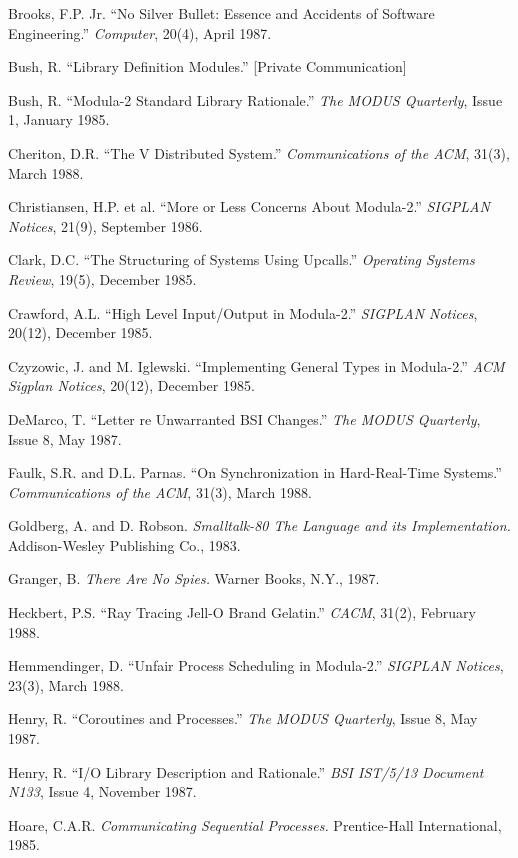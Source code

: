 Brooks, F.P. Jr. ``No Silver Bullet: Essence and Accidents of Software 
Engineering.'' {\em Computer}, 20(4), April 1987.
\smallskip

Bush, R. ``Library Definition Modules.'' [Private Communication]
\smallskip

Bush, R. ``Modula-2 Standard Library Rationale.'' {\em The MODUS Quarterly},
Issue 1, January 1985.
\smallskip

Cheriton, D.R.  ``The V Distributed System.'' {\em Communications of the
ACM}, 31(3), March 1988.
\smallskip

Christiansen, H.P. et al. ``More or Less Concerns About Modula-2.'' {\em
SIGPLAN Notices}, 21(9), September 1986.
\smallskip

Clark, D.C. ``The Structuring of Systems Using Upcalls.'' {\em Operating
Systems Review}, 19(5), December 1985.
\smallskip

Crawford, A.L. ``High Level Input/Output in Modula-2.'' {\em SIGPLAN
Notices}, 20(12), December 1985.
\smallskip

Czyzowic, J. and M. Iglewski. ``Implementing General Types in Modula-2.'' 
{\em ACM Sigplan
Notices}, 20(12), December 1985.
\smallskip

DeMarco, T. ``Letter re Unwarranted BSI Changes.'' {\em The MODUS
Quarterly}, Issue 8, May 1987.
\smallskip

Faulk, S.R. and D.L. Parnas.  ``On Synchronization in Hard-Real-Time Systems.''
{\em Communications of the ACM}, 31(3), March 1988.
\smallskip

Goldberg, A. and D. Robson.  {\em Smalltalk-80 The Language and its 
Implementation.} Addison-Wesley Publishing Co., 1983.
\smallskip

Granger, B.  {\em There Are No Spies.} Warner Books, N.Y., 1987.
\smallskip

Heckbert, P.S. ``Ray Tracing Jell-O Brand Gelatin.'' {\em CACM}, 31(2),
February 1988.
\smallskip

Hemmendinger, D. ``Unfair Process Scheduling in Modula-2.'' {\em SIGPLAN
Notices}, 23(3), March 1988.
\smallskip

Henry, R. ``Coroutines and Processes.'' {\em The MODUS Quarterly},
Issue 8, May 1987.
\smallskip

Henry, R. ``I/O Library Description and Rationale.'' {\em BSI IST/5/13
Document N133}, Issue 4, November 1987.
\smallskip

Hoare, C.A.R.  {\em Communicating Sequential Processes.} Prentice-Hall 
International, 1985.
\smallskip

